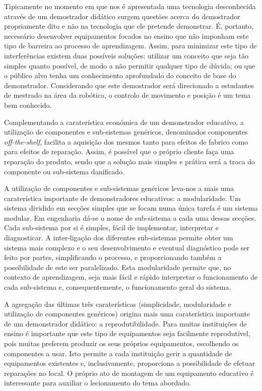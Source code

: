 Tipicamente no momento em que nos é apresentada uma tecnologia desconhecida
através de um demostrador didático surgem questões acerca do demostrador
propriamente dito e não na tecnologia que ele pretende demonstrar. É,
portanto, necessário desenvolver equipamentos focados no ensino que não
imponham este tipo de barreira ao processo de aprendizagem. Assim,
para minimizar este tipo de interferências existem duas possíveis soluções:
utilizar um conceito que seja tão simples quanto possível, de modo a
não permitir qualquer tipo de dúvida; ou que o público alvo tenha um
conhecimento aprofundado do conceito de base do demonstrador. Considerando
que este demostrador será direcionado a estudantes de mestrado na área da
robótica, o controlo de movimento e posição é um tema bem conhecido.

Complementando a caraterística económica de um demonstrador educativo,
a utilização de componentes e sub-sistemas genéricos, denominados
componentes \emph{off-the-shelf}, facilita a aquisição dos mesmos tanto
para efeitos de fabrico como para efeitos de reparação. Assim, é possível
que o próprio cliente faça uma reparação do produto, sendo que a solução
mais simples e prática será a troca do componente ou sub-sistema danificado.

A utilização de componentes e sub-sistemas genéricos leva-nos a mais uma
caraterística importante de demonstradores educativos: a modularidade. Um
sistema dividido em secções simples que se focam numa única tarefa é um
sistema modular. Em engenharia dá-se o nome de sub-sistema a cada uma
dessas secções. Cada sub-sistema por si é simples, fácil de implementar,
interpretar e diagnosticar. A inter-ligação dos diferentes sub-sistemas
permite obter um sistema mais complexo e o seu desenvolvimento e eventual
diagnóstico pode ser feito por partes, simplificando o processo, e
proporcionando também a possibilidade de este ser paralelizado.
Esta modularidade permite que, no contexto de aprendizagem, seja mais
fácil e rápido interpretar o funcionamento de cada sub-sistema e,
consequentemente, o funcionamento geral do sistema.

A agregação das últimas três caraterísticas (simplicidade, modularidade
e utilização de componentes genéricos) origina mais uma caraterística
importante de um demonstrador didático: a reprodutibilidade. Para muitas
instituições de ensino é importante que este tipo de equipamentos seja
facilmente reprodutível, pois muitas preferem produzir os seus próprios
equipamentos, escolhendo os componentes a usar. Isto permite a cada
instituição gerir a quantidade de equipamentos existentes e, inclusivamente,
proporciona a possibilidade de efetuar reparações no local. O próprio ato
de montagem de um equipamento educativo é interessante para auxiliar o
lecionamento do tema abordado.

